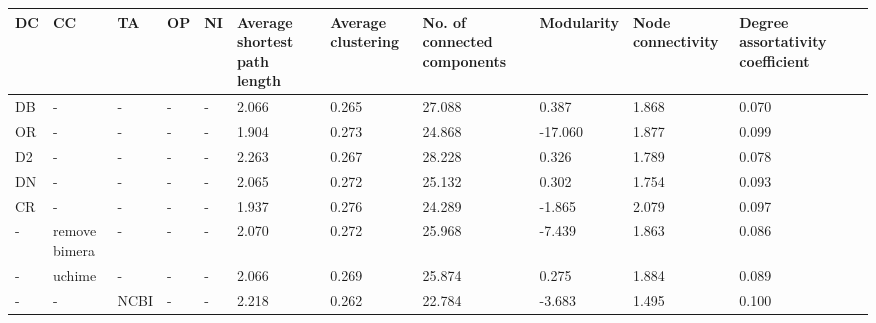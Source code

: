 \begin{landscape}
\begin{table}[H]
  \centering
  \small
  \begin{tabular}{|l|p{1cm}|p{1cm}|p{1cm}|p{2cm}|p{1.5cm}|p{1.5cm}|p{1.5cm}|p{1.5cm}|p{1.5cm}|p{1.5cm}|p{1.5cm}|}
\hline
DC & CC            & TA                & OP          & NI         & Average shortest path length & Average clustering & No. of connected components & Modularity & Node connectivity & Degree assortativity coefficient \\ \hline
DB & -             & -                 & -           & -          & 2.066                        & 0.265              & 27.088                      & 0.387      & 1.868             & 0.070                            \\
OR & -             & -                 & -           & -          & 1.904                        & 0.273              & 24.868                      & -17.060    & 1.877             & 0.099                            \\
D2 & -             & -                 & -           & -          & 2.263                        & 0.267              & 28.228                      & 0.326      & 1.789             & 0.078                            \\
DN & -             & -                 & -           & -          & 2.065                        & 0.272              & 25.132                      & 0.302      & 1.754             & 0.093                            \\
CR & -             & -                 & -           & -          & 1.937                        & 0.276              & 24.289                      & -1.865     & 2.079             & 0.097                            \\
-  & remove bimera & -                 & -           & -          & 2.070                        & 0.272              & 25.968                      & -7.439     & 1.863             & 0.086                            \\
-  & uchime        & -                 & -           & -          & 2.066                        & 0.269              & 25.874                      & 0.275      & 1.884             & 0.089                            \\
-  & -             & NCBI              & -           & -          & 2.218                        & 0.262              & 22.784                      & -3.683     & 1.495             & 0.100                            \\

\end{tabular}
\end{table}
\end{landscape}
